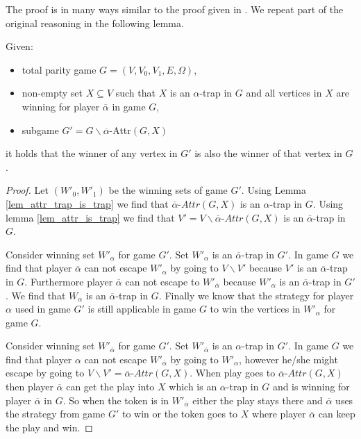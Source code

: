 The proof is in many ways similar to the proof given in \cite{ZIELONKA1998135}. We repeat part of the original reasoning in the following lemma.
\begin{lemma}
\label{lem_GwithoutB_is_subset}
	Given:
	\begin{itemize}
		\item total parity game $G = (V,V_0,V_1,E,\Omega)$,
		\item non-empty set $X \subseteq V$ such that $X$ is an $\alpha$-trap in $G$ and all vertices in $X$ are winning for player $\overline{\alpha}$ in game $G$,
		\item subgame $G' = G\backslash \overline{\alpha}$-Attr$(G,X)$
	\end{itemize}
	it holds that the winner of any vertex in $G'$ is also the winner of that vertex in $G$.
	\begin{proof}
		Let $(W'_0, W'_1)$ be the winning sets of game $G'$. Using Lemma \ref{lem_attr_trap_is_trap} we find that $\overline{\alpha}\textit{-Attr}(G,X)$ is an $\alpha$-trap in $G$. Using lemma \ref{lem_attr_is_trap} we find that $V' = V\backslash \overline{\alpha}\textit{-Attr}(G,X)$ is an $\overline{\alpha}$-trap in $G$.
		
		Consider winning set $W'_\alpha$ for game $G'$. Set $W'_\alpha$ is an $\overline{\alpha}$-trap in $G'$. In game $G$ we find that player $\overline{\alpha}$ can not escape $W'_\alpha$ by going to $V\backslash  V'$ because $V'$ is an $\overline{\alpha}$-trap in $G$. Furthermore player $\overline{\alpha}$ can not escape to $W'_{\overline{\alpha}}$ because $W'_\alpha$ is an $\overline{\alpha}$-trap in $G'$. We find that $W_\alpha$ is an $\overline{\alpha}$-trap in $G$. Finally we know that the strategy for player $\alpha$ used in game $G'$ is still applicable in game $G$ to win the vertices in $W'_\alpha$ for game $G$.
		
		Consider winning set $W'_{\overline{\alpha}}$ for game $G'$. Set $W'_{\overline{\alpha}}$ is an $\alpha$-trap in $G'$. In game $G$ we find that player $\alpha$ can not escape $W'_{\overline{\alpha}}$ by going to $W'_\alpha$, however he/she might escape by going to $V\backslash V' = \overline{\alpha}\textit{-Attr}(G,X)$. When play goes to $\overline{\alpha}\textit{-Attr}(G,X)$ then player $\overline{\alpha}$ can get the play into $X$ which is an $\alpha$-trap in $G$ and is winning for player $\overline{\alpha}$ in $G$. So when the token is in $W'_{\overline{\alpha}}$ either the play stays there and $\overline{\alpha}$ uses the strategy from game $G'$ to win or the token goes to $X$ where player $\overline{\alpha}$ can keep the play and win.
	\end{proof}
\end{lemma}
